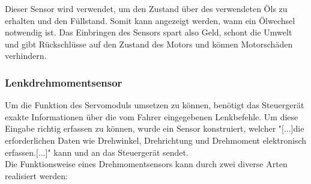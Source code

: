 			Dieser Sensor wird verwendet, um den Zustand über des verwendeten Öls zu erhalten und den Füllstand. Somit kann angezeigt werden, wann ein Ölwechsel notwendig ist. Das Einbringen des Sensors spart also Geld, schont die Umwelt und gibt Rückschlüsse auf den Zustand des Motors und können Motorschäden verhindern.\cite{TS_oel}

		
			\subsubsection{Lenkdrehmomentsensor}
				Um die Funktion des Servomoduls umsetzen zu können, benötigt das Steuergerät exakte Informationen über die vom Fahrer eingegebenen Lenkbefehle. Um diese Eingabe richtig erfassen zu können, wurde ein Sensor konstruiert, welcher "[...]die erforderlichen Daten wie Drehwinkel, Drehrichtung und Drehmoment elektronisch erfassen.[...]"\cite{TS_dreh} kann und an das Steuergerät sendet.\\
				Die Funktionsweise eines Drehmomentsensors kann durch zwei diverse Arten realisiert werden:\\
				
